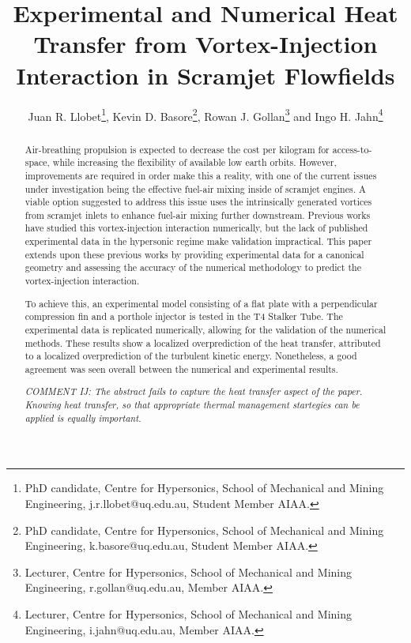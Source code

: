\documentclass{AIAA}
\begin{document}
\title{Experimental and Numerical Heat Transfer from Vortex-Injection Interaction in Scramjet Flowfields}

\author{Juan R. Llobet\footnote{PhD candidate, Centre for Hypersonics, School of Mechanical and Mining Engineering, j.r.llobet@uq.edu.au, Student Member AIAA.}, Kevin D. Basore\footnote{PhD candidate, Centre for Hypersonics, School of Mechanical and Mining Engineering, k.basore@uq.edu.au, Student Member AIAA.}, Rowan J. Gollan\footnote{Lecturer, Centre for Hypersonics, School of Mechanical and Mining Engineering, r.gollan@uq.edu.au, Member AIAA.} and Ingo H. Jahn\footnote{Lecturer, Centre for Hypersonics, School of Mechanical and Mining Engineering, i.jahn@uq.edu.au, Member AIAA.}}

\begin{abstract}


Air-breathing propulsion is expected to decrease the cost per kilogram for access-to-space, while increasing the flexibility of available low earth orbits.
However, improvements are required in order make this a reality, with one of the current issues under investigation being the effective fuel-air mixing inside of scramjet engines.
A viable option suggested to address this issue uses the intrinsically generated vortices from scramjet inlets to enhance fuel-air mixing further downstream.
Previous works have studied this vortex-injection interaction numerically, but the lack of published experimental data in the hypersonic regime make validation impractical.
This paper extends upon these previous works by providing experimental data for a canonical geometry and assessing the accuracy of the numerical methodology to predict the vortex-injection interaction.


To achieve this, an experimental model consisting of a flat plate with a perpendicular compression fin and a porthole injector is tested in the T4 Stalker Tube.
The experimental data is replicated numerically, allowing for the validation of the numerical methods.
These results show a localized overprediction of the heat transfer, attributed to a localized overprediction of the turbulent kinetic energy.
Nonetheless, a good agreement was seen overall between the numerical and experimental results. 

{\it COMMENT IJ: The abstract fails to capture the heat transfer aspect of the paper. Knowing heat transfer, so that appropriate thermal management startegies can be applied is equally important. }

\end{abstract}
\end{document}
